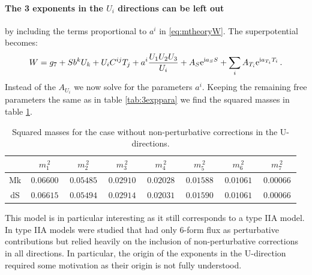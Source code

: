 \documentclass[12pt]{report}
\newcommand{\be}{\begin{equation}}
\newcommand{\ee}{\end{equation}}
\def\rmi{{\rm i}}
\def\rme{{\rm e}}
\begin{document}
\paragraph{The 3 exponents in the $U_i$ directions can be left out} by including the terms proportional to $a^i$ in \eqref{eq:mtheoryW}. The superpotential becomes:
\be
W = g_7 + S b^k U_k + U_i C^{ij} T_j + a^i \frac{U_1 U_2 U_3}{U_i} + A_S \rme^{\rmi a_S S} + \sum_i  A_{T_i} \rme^{\rmi a_{T_i}T_i}\,.
\ee
Instead of the $A_{U_i}$ we now solve for the parameters $a^i$. Keeping the remaining free parameters the same as in table \ref{tab:3exppara} we find the squared masses in table \ref{tab:noUmass}.
\begin{table}[htb]
\center
\begin{tabular}{|c|c|c|c|c|c|c|c|}\hline
     &$\,m_1^{\,2}\,$&$\,m_2^{\,2}\,$&$\,m_3^{\,2}\,$&$\,m_4^{\,2}\,$&$\,m_5^{\,2}\,$&$\,m_6^{\,2}\,$&$\,m_7^{\,2}\,$\\\hline
Mk & $\, 0.06600 \,$ & $\, 0.05485 \,$ & $\, 0.02910 \,$ & $\, 0.02028 \,$ & $\, 0.01588 \,$ & $\, 0.01061 \,$ & $\, 0.00066 \,$ \\\hline  
dS & $\, 0.06615 \,$ & $\, 0.05494 \,$ & $\, 0.02914 \,$ & $\, 0.02031 \,$ & $\, 0.01590 \,$ & $\, 0.01061 \,$ & $\, 0.00066 \,$  \\\hline  
\end{tabular}
\caption{Squared masses for the case without non-perturbative corrections in the U-directions.}
\label{tab:noUmass}
\end{table}
This model is in particular interesting as it still corresponds to a type IIA model. In \cite{Cribiori:2019drf,Cribiori:2019bfx} type IIA models were studied that had only 6-form flux as perturbative contributions but relied heavily on the inclusion of non-perturbative corrections in all directions. In particular, the origin of the exponents in the U-direction required some motivation as their origin is not fully understood.

\FloatBarrier
\end{document}
